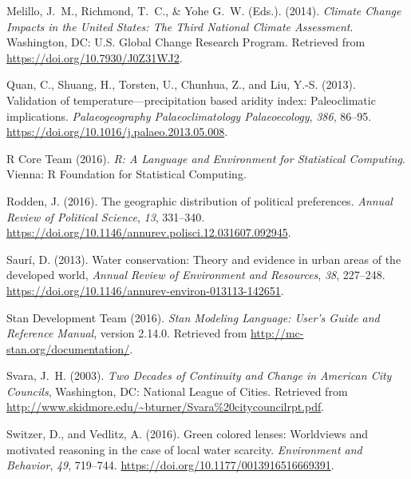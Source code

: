 \documentclass[draft]{agujournal}\usepackage{knitr}
\begin{document}
\begin{thebibliography}{33}
  Melillo, J.~M., Richmond, T.~C., \&  Yohe G.~W. (Eds.). (2014).
  \textit{Climate Change Impacts in the {U}nited {S}tates: {T}he Third National Climate
  Assessment}.
  Washington, DC: U.S. Global Change Research Program.
  Retrieved from \url{https://doi.org/10.7930/J0Z31WJ2}.

  Quan, C., Shuang, H., Torsten, U., Chunhua, Z., and Liu, Y.-S. (2013).
  Validation of temperature---precipitation based aridity index: Paleoclimatic
  implications.
  \textit{Palaeogeography Palaeoclimatology Palaeoecology}, \textit{386}, 86--95.
  \url{https://doi.org/10.1016/j.palaeo.2013.05.008}.

  {R Core Team} (2016). \textit{R: A Language and Environment for Statistical
  Computing}.
  Vienna: R Foundation for Statistical Computing.

  Rodden, J. (2016).
  The geographic distribution of political preferences.
  \textit{Annual Review of Political Science}, \textit{13}, 331--340.
  \url{https://doi.org/10.1146/annurev.polisci.12.031607.092945}.

  Saur\'i, D. (2013).
  Water conservation: {T}heory and evidence in urban areas of the developed world,
  \textit{Annual Review of Environment and Resources}, \textit{38}, 227--248.
  \url{https://doi.org/10.1146/annurev-environ-013113-142651}.

  {Stan Development Team} (2016).
  \textit{{S}tan Modeling Language: User's Guide and Reference Manual}, version 2.14.0.
  Retrieved from
  \url{http://mc-stan.org/documentation/}.

  Svara, J.~H. (2003).
  \textit{Two Decades of Continuity and Change in American City Councils},
  Washington, DC: National League of Cities.
  Retrieved from
  \url{http://www.skidmore.edu/~bturner/Svara%20citycouncilrpt.pdf}.

  Switzer, D., and Vedlitz, A. (2016).
  Green colored lenses: Worldviews and motivated reasoning in the case of local
  water scarcity.
  \textit{Environment and Behavior}, \textit{49}, 719--744.
  \url{https://doi.org/10.1177/0013916516669391}.


\end{thebibliography}
\end{document}
